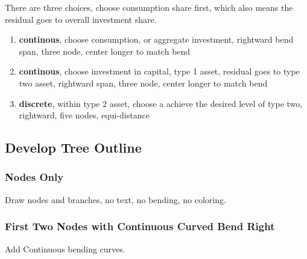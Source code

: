 \documentclass{article}
\begin{document}
There are three choices, choose consumption share first, which also means the residual goes to overall investment share.

\begin{enumerate}
  \item \textbf{continous}, choose consumption, or aggregate investment, rightward bend span, three node, center longer to match bend
  \item \textbf{continous}, choose investment in capital, type 1 asset, residual goes to type two asset, rightward span, three node, center longer to match bend
  \item \textbf{discrete}, within type 2 asset, choose a achieve the desired level of type two, rightward, five nodes, equi-distance
\end{enumerate}

\subsection{Develop Tree Outline}

\subsubsection{Nodes Only}

Draw nodes and branches, no text, no bending, no coloring.

\def\famm{5mm}
\begin{center}
\end{center}


\subsubsection{First Two Nodes with Continuous Curved Bend Right}

Add Continuous bending curves.
\end{document}
